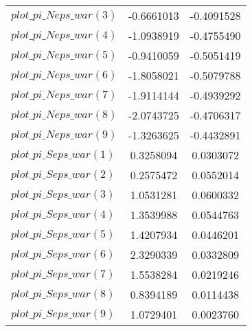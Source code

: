 \begin{center}
\begin{longtable}{lcc}
$plot\_pi\_N eps\_war (3)   $	 & 	     -0.6661013	 & 	     -0.4091528 \\ 
$plot\_pi\_N eps\_war (4)   $	 & 	     -1.0938919	 & 	     -0.4755490 \\ 
$plot\_pi\_N eps\_war (5)   $	 & 	     -0.9410059	 & 	     -0.5051419 \\ 
$plot\_pi\_N eps\_war (6)   $	 & 	     -1.8058021	 & 	     -0.5079788 \\ 
$plot\_pi\_N eps\_war (7)   $	 & 	     -1.9114144	 & 	     -0.4939292 \\ 
$plot\_pi\_N eps\_war (8)   $	 & 	     -2.0743725	 & 	     -0.4706317 \\ 
$plot\_pi\_N eps\_war (9)   $	 & 	     -1.3263625	 & 	     -0.4432891 \\ 
$plot\_pi\_S eps\_war (1)   $	 & 	      0.3258094	 & 	      0.0303072 \\ 
$plot\_pi\_S eps\_war (2)   $	 & 	      0.2575472	 & 	      0.0552014 \\ 
$plot\_pi\_S eps\_war (3)   $	 & 	      1.0531281	 & 	      0.0600332 \\ 
$plot\_pi\_S eps\_war (4)   $	 & 	      1.3539988	 & 	      0.0544763 \\ 
$plot\_pi\_S eps\_war (5)   $	 & 	      1.4207934	 & 	      0.0446201 \\ 
$plot\_pi\_S eps\_war (6)   $	 & 	      2.3290339	 & 	      0.0332809 \\ 
$plot\_pi\_S eps\_war (7)   $	 & 	      1.5538284	 & 	      0.0219246 \\ 
$plot\_pi\_S eps\_war (8)   $	 & 	      0.8394189	 & 	      0.0114438 \\ 
$plot\_pi\_S eps\_war (9)   $	 & 	      1.0729401	 & 	      0.0023760 \\ 
\end{longtable}
 \end{center}
